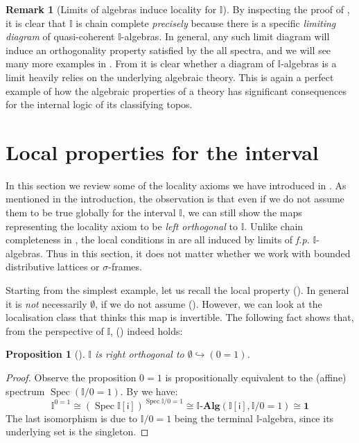 \documentclass[a4paper,12pt]{amsart}
\newtheorem{proposition}[theorem]{Proposition}
\theoremstyle{definition}
\newtheorem{remark}[theorem]{Remark}
\newcommand{\mb}[1]{\mathbf{#1}}
\newcommand{\mbb}[1]{\mathbb{#1}}
\newcommand{\I}{\mbb I}
\newcommand{\ms}[1]{\mathsf{#1}}
\newcommand{\alg}{\text{-}\mb{Alg}}
\newcommand{\hook}{\hookrightarrow}
\newcommand{\emp}{\emptyset}
\newcommand{\spec}{\operatorname{Spec}}
\begin{document}
\begin{remark}[Limits of algebras induce locality for $\I$]\label{rem:limofalgloc}
  By inspecting the proof of , it is clear that $\I$ is chain complete \emph{precisely} because there is a specific \emph{limiting diagram} of quasi-coherent $\I$-algebras. In general, any such limit diagram will induce an orthogonality property satisfied by the all spectra, and we will see many more examples in . From  it is clear whether a diagram of $\I$-algebras is a limit heavily relies on the underlying algebraic theory. This is again a perfect example of how the algebraic properties of a theory has significant consequences for the internal logic of its classifying topos.
\end{remark}

\section{Local properties for the interval}\label{sec:local}

In this section we review some of the locality axioms we have introduced in . As mentioned in the introduction, the observation is that even if we do not assume them to be true globally for the interval $\I$, we can still show the maps representing the locality axiom to be \emph{left orthogonal} to $\I$.  
Unlike chain completeness in , the local conditions in  are all induced by limits of \emph{f.p.} $\I$-algebras. Thus in this section, it does not matter whether we work with bounded distributive lattices or $\sigma$-frames.

Starting from the simplest example, let us recall the local property (\AxiomNT). In general it is \emph{not} necessarily $\emp$, if we do not assume (\AxiomNT). However, we can look at the localisation class that thinks this map is invertible. The following fact shows that, from the perspective of $\I$, (\AxiomNT) indeed holds:

\begin{proposition}[\AxiomSQCI]\label{specisnontrivial}
  $\I$ is right orthogonal to $\emp \hook (0 = 1)$.
\end{proposition}
\begin{proof}
  Observe the proposition $0 = 1$ is propositionally equivalent to the (affine) spectrum $\spec(\I/0=1)$. By  we have:
  \[ 
    \I^{0=1} \cong 
    (\spec \I[\ms{i}])^{\spec{\I/0=1}}
    \cong 
    \I\alg(\I[\ms{i}], \I/0=1) 
    \cong 
    \mathbf{1}
  \]
  The last isomorphism is due to $\I/0=1$ being the terminal $\I$-algebra, since its underlying set is the singleton.
\end{proof}
\end{document}
